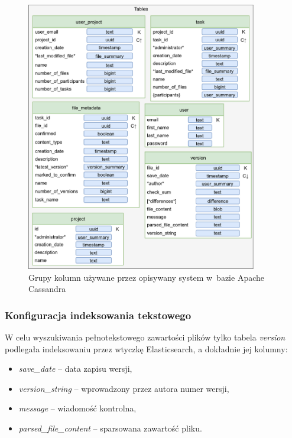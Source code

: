 \begin{figure}[!ht]
\centering
\includegraphics[width=0.9\textwidth]{figures/cassandra_tables.png}
\caption{Grupy kolumn używane przez opisywany system w~bazie Apache Cassandra}
\label{fig:CassandraTables}
\end{figure}

\subsubsection{Konfiguracja indeksowania tekstowego} \label{sec:cassandraTextIndexConfig}

W celu wyszukiwania pełnotekstowego zawartości plików tylko tabela \textit{version} podlegała indeksowaniu przez wtyczkę Elasticsearch,
a dokładnie jej kolumny:
\begin{itemize}
    \item \textit{save\_date} -- data zapisu wersji,
    \item \textit{version\_string} -- wprowadzony przez autora numer wersji,
    \item \textit{message} -- wiadomość kontrolna,
    \item \textit{parsed\_file\_content} -- sparsowana zawartość pliku.
\end{itemize}

